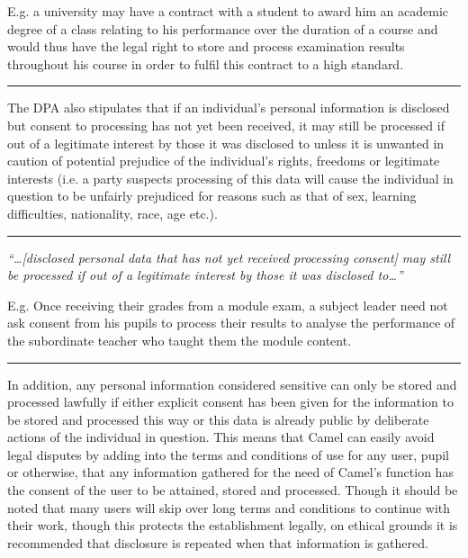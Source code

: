 \begin{flushright}
\scriptsize E.g. a university may have a contract with a student to award him an academic degree of a class relating to his performance over the duration of a course and would thus have the legal right to store and process examination results throughout his course in order to fulfil this contract to a high standard.
\end{flushright}
\hrule
\vspace{0.2cm}

The DPA also stipulates that if an individual’s personal information is disclosed but consent to processing has not yet been received, it may still be processed if out of a legitimate interest by those it was disclosed to unless it is unwanted in caution of potential prejudice of the individual’s rights, freedoms or legitimate interests\cite{DPA:tDPP:S2} (i.e. a party suspects processing of this data will cause the individual in question to be unfairly prejudiced for reasons such as that of sex, learning difficulties, nationality, race, age etc.).

\vspace{0.2cm}
\hrule
\begin{center}
\small \em “\ldots[disclosed personal data that has not yet received processing consent] may still be processed if out of a legitimate interest by those it was disclosed to…”
\end{center}

\begin{flushright}
\scriptsize E.g. Once receiving their grades from a module exam, a subject leader need not ask consent from his pupils to process their results to analyse the performance of the subordinate teacher who taught them the module content.
\end{flushright}
\hrule
\vspace{0.2cm}

    In addition, any personal information considered sensitive can only be stored and processed lawfully if either explicit consent has been given for the information to be stored and processed this way or this data is already public by deliberate actions of the individual in question.\cite{DPA:tDPP:S3} This means that Camel can easily avoid legal disputes by adding into the terms and conditions of use for any user, pupil or otherwise, that any information gathered for the need of Camel’s function has the consent of the user to be attained, stored and processed. Though it should be noted that many users will skip over long terms and conditions to continue with their work, though this protects the establishment legally, on ethical grounds it is recommended that disclosure is repeated when that information is gathered.

